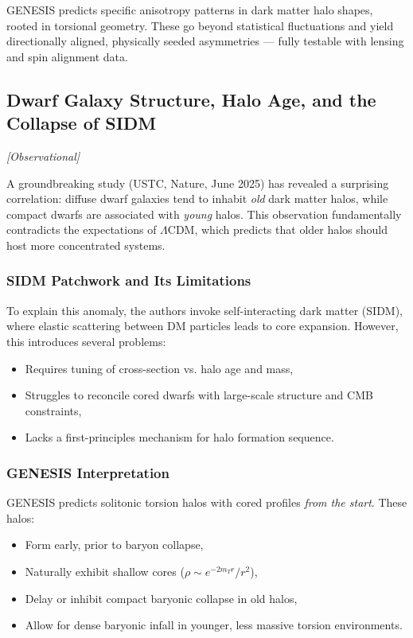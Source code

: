 \documentclass{article}
\newcommand{\obstag}{\textcolor{green!60!black}{\textit{[Observational]}}}
\begin{document}
\begin{tcolorbox}[colback=gray!5, colframe=black!30, title=Why this matters]
GENESIS predicts specific anisotropy patterns in dark matter halo shapes, rooted in torsional geometry. These go beyond statistical fluctuations and yield directionally aligned, physically seeded asymmetries — fully testable with lensing and spin alignment data.
\end{tcolorbox}


\subsection{ Dwarf Galaxy Structure, Halo Age, and the Collapse of SIDM}
\label{sec:dwarf_torsion_test}
\obstag


A groundbreaking study (USTC, Nature, June 2025) has revealed a surprising correlation: diffuse dwarf galaxies tend to inhabit \textit{old} dark matter halos, while compact dwarfs are associated with \textit{young} halos. This observation fundamentally contradicts the expectations of $\Lambda$CDM, which predicts that older halos should host more concentrated systems.

\subsubsection*{SIDM Patchwork and Its Limitations}
To explain this anomaly, the authors invoke self-interacting dark matter (SIDM), where elastic scattering between DM particles leads to core expansion. However, this introduces several problems:
\begin{itemize}
  \item Requires tuning of cross-section vs. halo age and mass,
  \item Struggles to reconcile cored dwarfs with large-scale structure and CMB constraints,
  \item Lacks a first-principles mechanism for halo formation sequence.
\end{itemize}

\subsubsection*{GENESIS Interpretation}
GENESIS predicts solitonic torsion halos with cored profiles \emph{from the start}. These halos:
\begin{itemize}
  \item Form early, prior to baryon collapse,
  \item Naturally exhibit shallow cores ($\rho \sim e^{-2 m_T r}/r^2$),
  \item Delay or inhibit compact baryonic collapse in old halos,
  \item Allow for dense baryonic infall in younger, less massive torsion environments.
\end{itemize}
\end{document}
